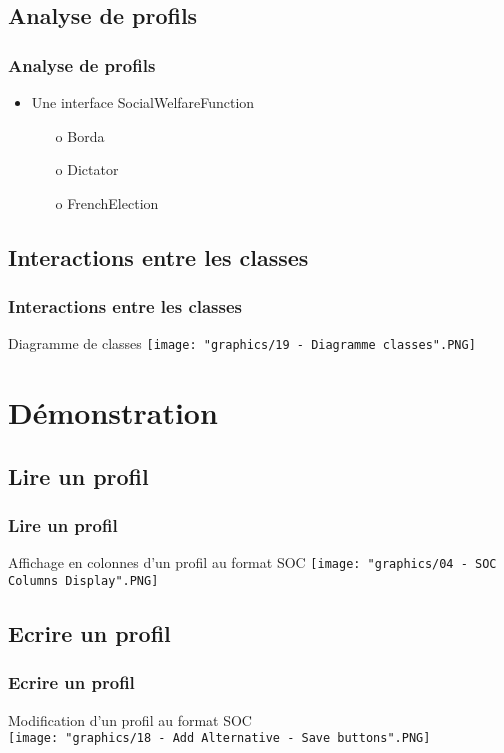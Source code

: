 \documentclass[english, french]{beamer}
\begin{document}
    \subsection{Analyse de profils}
	    \begin{frame}
        	\frametitle{Analyse de profils}
            	\begin{itemize}
            	    \item Une interface SocialWelfareFunction
            	    \begin{itemize}
            	        \item[o] Borda
            	        \item[o] Dictator
            	        \item[o] FrenchElection
            	    \end{itemize}
            	\end{itemize}
        \end{frame}
	\subsection{Interactions entre les classes}
        \begin{frame}
        	\frametitle{Interactions entre les classes}
        	\begin{center}
        	    Diagramme de classes
        	    \texttt{[image: "graphics/19 - Diagramme classes".PNG]}
        	\end{center}
        \end{frame}

\section{Démonstration}
	\subsection{Lire un profil}
	    \begin{frame}
        	\frametitle{Lire un profil}
        	\begin{center}
        	    Affichage en colonnes d'un profil au format SOC
        	    \texttt{[image: "graphics/04 - SOC Columns Display".PNG]}
        	\end{center}
        \end{frame}
        
	\subsection{Ecrire un profil}
	    \begin{frame}
        	\frametitle{Ecrire un profil}
        	\begin{center}
        	    Modification d'un profil au format SOC\\
        	    \texttt{[image: "graphics/18 - Add Alternative - Save buttons".PNG]}
        	\end{center}
        \end{frame}
\end{document}
